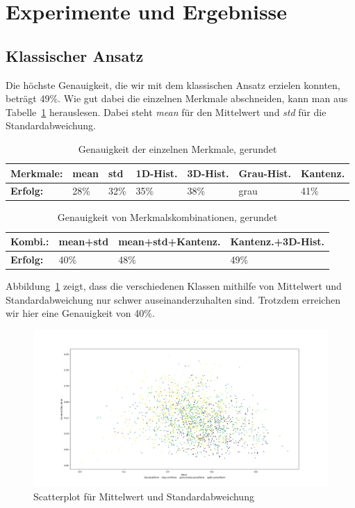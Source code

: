 \documentclass[a4,german]{article}
\begin{document}
\section{Experimente und Ergebnisse}

\subsection{Klassischer Ansatz}%
Die höchste Genauigkeit, die wir mit dem klassischen Ansatz erzielen konnten, beträgt 49\%. Wie gut dabei die einzelnen Merkmale abschneiden, kann man aus Tabelle~\ref{tab:gen} herauslesen. Dabei steht \textit{mean} für den Mittelwert und \textit{std} für die Standardabweichung. 
\begin{table}[h]
\begin{tabular}{|l|l|l|l|l|l|l|}
 \hline
 \textbf{Merkmale:}&mean&std&1D-Hist.&3D-Hist.&Grau-Hist.&Kantenz.\\
 \hline
 \textbf{Erfolg:} & 28\% & 32\% & 35\% & 38\% & grau & 41\% \\
 \hline
\end{tabular}
\caption{Genauigkeit der einzelnen Merkmale, gerundet}
\label{tab:gen}
\end{table}

\begin{table}[h]
\begin{tabular}{|l|l|l|l|}
 \hline
 \textbf{Kombi.:}&mean+std&mean+std+Kantenz.&Kantenz.+3D-Hist.\\
 \hline
 \textbf{Erfolg:} & 40\% & 48\% & 49\% \\
 \hline
\end{tabular}
\caption{Genauigkeit von Merkmalskombinationen, gerundet}
\label{tab:gen2}
\end{table}

Abbildung~\ref{fig:meanstd} zeigt, dass die verschiedenen Klassen mithilfe von Mittelwert und Standardabweichung nur schwer auseinanderzuhalten sind. Trotzdem erreichen wir hier eine Genauigkeit von 40\%.
\begin{figure}[h!]
\centering
\includegraphics[width=1.1\textwidth]{Scatterplot_mean_std.png} %
\caption{Scatterplot für Mittelwert und Standardabweichung}
\label{fig:meanstd}
\end{figure}
\end{document}
